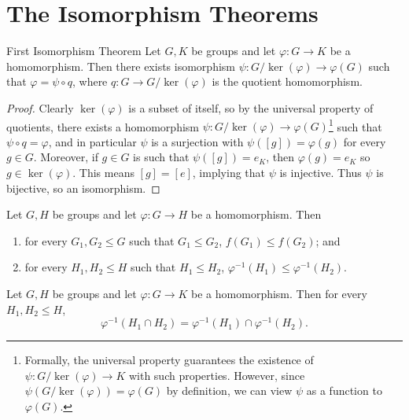 \documentclass[pmath347]{subfiles}
\begin{document}
    \section{The Isomorphism Theorems}

    \begin{theorem}{First Isomorphism Theorem}
        Let $G,K$ be groups and let $\varphi:G\to K$ be a homomorphism. Then there exists isomorphism $\psi:G /\ker\left( \varphi \right) \to \varphi\left( G \right)$ such that $\varphi = \psi\circ  q$, where $q:G\to G /\ker\left( \varphi \right) $ is the quotient homomorphism.
    \end{theorem}

    \begin{proof}
        Clearly $\ker\left( \varphi \right)$ is a subset of itself, so by the universal property of quotients, there exists a homomorphism $\psi:G /\ker\left( \varphi \right) \to \varphi\left( G \right) $\footnote{Formally, the universal property guarantees the existence of $\psi:G /\ker\left( \varphi \right) \to K$ with such properties. However, since $\psi\left( G /\ker\left( \varphi \right)  \right) = \varphi\left( G \right)$ by definition, we can view $\psi$ as a function to $\varphi\left( G \right) $.} such that $\psi\circ q = \varphi$, and in particular $\psi$ is a surjection with $\psi\left( \left[ g \right]  \right) = \varphi\left( g \right)$ for every $g\in G$. Moreover, if $g\in G$ is such that $\psi\left( \left[ g \right]  \right) = e_K$, then $\varphi\left( g \right) = e_K$ so $g\in \ker\left( \varphi \right)$. This means $\left[ g \right] = \left[ e \right]$, implying that $\psi$ is injective. Thus $\psi$ is bijective, so an isomorphism.
    \end{proof}

    \clearpage
    \begin{prop}{}
        Let $G,H$ be groups and let $\varphi:G\to H$ be a homomorphism. Then
        \begin{enumerate}
            \item for every $G_1,G_2\leq G$ such that $G_1\leq G_2$, $f\left( G_1 \right) \leq f\left( G_2 \right)$; and
            \item for every $H_1,H_2\leq H$ such that $H_1\leq H_2$, $\varphi^{-1} \left( H_1 \right) \leq \varphi^{-1} \left( H_2 \right)$.
        \end{enumerate}
    \end{prop}

    \begin{prop}{}
        Let $G,H$ be groups and let $\varphi:G\to K$ be a homomorphism. Then for every $H_1,H_2\leq H$,
        \begin{equation*}
            \varphi^{-1} \left( H_1\cap H_2 \right) = \varphi^{-1} \left( H_1 \right) \cap \varphi^{-1} \left( H_2 \right) .
        \end{equation*}
    \end{prop}
\end{document}
